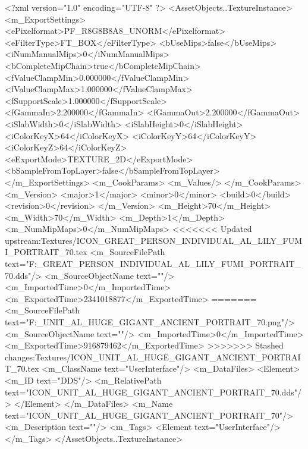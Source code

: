 <?xml version="1.0" encoding="UTF-8" ?>
<AssetObjects..TextureInstance>
	<m_ExportSettings>
		<ePixelformat>PF_R8G8B8A8_UNORM</ePixelformat>
		<eFilterType>FT_BOX</eFilterType>
		<bUseMips>false</bUseMips>
		<iNumManualMips>0</iNumManualMips>
		<bCompleteMipChain>true</bCompleteMipChain>
		<fValueClampMin>0.000000</fValueClampMin>
		<fValueClampMax>1.000000</fValueClampMax>
		<fSupportScale>1.000000</fSupportScale>
		<fGammaIn>2.200000</fGammaIn>
		<fGammaOut>2.200000</fGammaOut>
		<iSlabWidth>0</iSlabWidth>
		<iSlabHeight>0</iSlabHeight>
		<iColorKeyX>64</iColorKeyX>
		<iColorKeyY>64</iColorKeyY>
		<iColorKeyZ>64</iColorKeyZ>
		<eExportMode>TEXTURE_2D</eExportMode>
		<bSampleFromTopLayer>false</bSampleFromTopLayer>
	</m_ExportSettings>
	<m_CookParams>
		<m_Values/>
	</m_CookParams>
	<m_Version>
		<major>1</major>
		<minor>0</minor>
		<build>0</build>
		<revision>0</revision>
	</m_Version>
	<m_Height>70</m_Height>
	<m_Width>70</m_Width>
	<m_Depth>1</m_Depth>
	<m_NumMipMaps>0</m_NumMipMaps>
<<<<<<< Updated upstream:Textures/ICON_GREAT_PERSON_INDIVIDUAL_AL_LILY_FUMI_PORTRAIT_70.tex
	<m_SourceFilePath text="F:\DT\lilyimages\gpportrait\ICON_GREAT_PERSON_INDIVIDUAL_AL_LILY_FUMI_PORTRAIT_70.dds"/>
	<m_SourceObjectName text=""/>
	<m_ImportedTime>0</m_ImportedTime>
	<m_ExportedTime>2341018877</m_ExportedTime>
=======
	<m_SourceFilePath text="F:\DT\lilyimages\all\ICON_UNIT_AL_HUGE_GIGANT_ANCIENT_PORTRAIT_70.png"/>
	<m_SourceObjectName text=""/>
	<m_ImportedTime>0</m_ImportedTime>
	<m_ExportedTime>916879462</m_ExportedTime>
>>>>>>> Stashed changes:Textures/ICON_UNIT_AL_HUGE_GIGANT_ANCIENT_PORTRAIT_70.tex
	<m_ClassName text="UserInterface"/>
	<m_DataFiles>
		<Element>
			<m_ID text="DDS"/>
			<m_RelativePath text="ICON_UNIT_AL_HUGE_GIGANT_ANCIENT_PORTRAIT_70.dds"/>
		</Element>
	</m_DataFiles>
	<m_Name text="ICON_UNIT_AL_HUGE_GIGANT_ANCIENT_PORTRAIT_70"/>
	<m_Description text=""/>
	<m_Tags>
		<Element text="UserInterface"/>
	</m_Tags>
</AssetObjects..TextureInstance>


